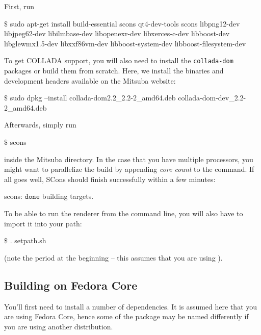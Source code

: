 First, run
\begin{shell}
$\text{\$}$ sudo apt-get install build-essential scons qt4-dev-tools scons libpng12-dev libjpeg62-dev libilmbase-dev libopenexr-dev libxerces-c-dev libboost-dev libglewmx1.5-dev libxxf86vm-dev libboost-system-dev libboost-filesystem-dev
\end{shell}
To get COLLADA support, you will also need to install the \texttt{collada-dom} packages or build them from scratch. Here, we install the  binaries and development headers available on the Mitsuba website:
\begin{shell}
$\text{\$}$ sudo dpkg --install collada-dom2.2_2.2-2_amd64.deb collada-dom-dev_2.2-2_amd64.deb
\end{shell}
Afterwards, simply run
\begin{shell}
$\text{\$}$ scons
\end{shell}
inside the Mitsuba directory. In the case that you have multiple processors, you might want to parallelize the build by appending \emph{core count} to the command.
If all goes well, SCons should finish successfully within a few minutes:
\begin{shell}
scons: $\texttt{done}$ building targets.
\end{shell}
To be able to run the renderer from the command line, you will also have to import it into your path:
\begin{shell}
$\text{\$}$ . setpath.sh
\end{shell}
(note the period at the beginning -- this assumes that you are using ).

\subsection{Building on Fedora Core}
You'll first need to install a number of dependencies. It is assumed here
that you are using Fedora Core, hence some of the package may be named differently if you are 
using another distribution.

